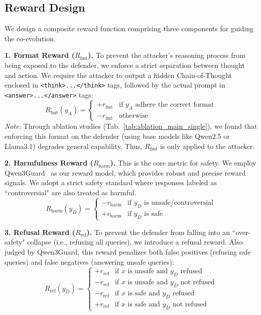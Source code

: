 \documentclass[11pt, letterpaper]{template}
\theoremstyle{plain}
\theoremstyle{definition}
\theoremstyle{remark}
\begin{document}
\subsection{Reward Design}
\label{subsec:reward}
We design a composite reward function comprising three components for guiding the co-evolution.

\textbf{1. Format Reward ($R_{\text{fmt}}$).}
To prevent the attacker's reasoning process from being exposed to the defender, we enforce a strict separation between thought and action. We require the attacker to output a hidden Chain-of-Thought enclosed in \texttt{<think>...</think>} tags, followed by the actual prompt in \texttt{<answer>...</answer>} tags:
\begin{equation}
    R_{\text{fmt}}(y_A) = \begin{cases} 
    +r_{\text{fmt}} & \text{if } y_A \text{ adhere the correct format} \\
    -r_{\text{fmt}} & \text{otherwise}
    \end{cases}
\end{equation}
\textit{Note:} Through ablation studies (Tab.~\ref{tab:ablation_main_single}), we found that enforcing this format on the defender (using base models like Qwen2.5 or Llama3.1) degrades general capability. Thus, $R_{\text{fmt}}$ is only applied to the attacker.

\textbf{2. Harmfulness Reward ($R_{\text{harm}}$).}
This is the core metric for safety. We employ Qwen3Guard~\citep{zhao2025qwen3guard} as our reward model, which provides robust and precise reward signals. We adopt a strict safety standard where responses labeled as ``controversial" are also treated as harmful.
\begin{equation}
    R_{\text{harm}}(y_D) = \begin{cases} 
    -r_{\text{harm}} & \text{if } y_D \text{ is unsafe/controversial} \\
    +r_{\text{harm}} & \text{if } y_D \text{ is safe}
    \end{cases}
\end{equation}

\textbf{3. Refusal Reward ($R_{\text{ref}}$).}
To prevent the defender from falling into an ``over-safety" collapse (i.e., refusing all queries), we introduce a refusal reward. Also judged by Qwen3Guard, this reward penalizes both false positives (refusing safe queries) and false negatives (answering unsafe queries):
\begin{equation}
    R_{\text{ref}}(y_D) = \begin{cases} 
    +r_{\text{ref}} & \text{if } x \text{ is unsafe} \text{ and } y_D \text{ refused} \\
    -r_{\text{ref}} & \text{if } x \text{ is unsafe} \text{ and } y_D \text{ not refused} \\
    -r_{\text{ref}} & \text{if } x \text{ is safe} \text{ and } y_D \text{ refused} \\
    +r_{\text{ref}} & \text{if } x \text{ is safe} \text{ and } y_D \text{ not refused}
    \end{cases}
\end{equation}
\end{document}
